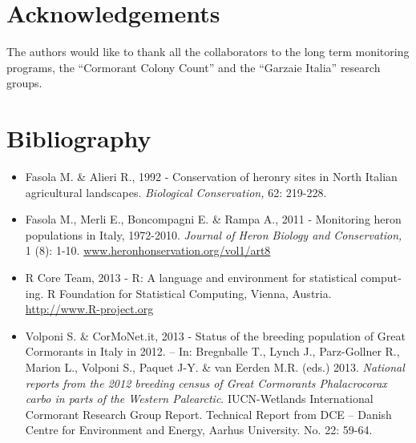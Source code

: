 \begin{otherlanguage}{english}
\section*{Acknowledgements}
The authors would like to thank all the collaborators to the long term
monitoring programs, the {\textquotedblleft}Cormorant Colony
Count{\textquotedblright} and the {\textquotedblleft}Garzaie
Italia{\textquotedblright} research groups.

\section*{Bibliography}
\begin{itemize}\itemsep0pt

	\item Fasola M. \& Alieri R., 1992 - Conservation of heronry sites in North
Italian agricultural landscapes. \textit{Biological Conservation,} 62:
219-228.

	\item Fasola M., Merli E., Boncompagni E. \& Rampa A., 2011 - Monitoring heron
populations in Italy, 1972-2010. \textit{Journal of Heron Biology and
Conservation,} 1 (8): 1-10. \url{www.heronhonservation.org/vol1/art8}

	\item R Core Team, 2013 - R: A language and environment for statistical
computing. R Foundation for Statistical Computing, Vienna, Austria. \\ \url{http://www.R-project.org}

	\item Volponi S. \& CorMoNet.it, 2013 - Status of the breeding population of
Great Cormorants in Italy in 2012. -- In: Bregnballe T., Lynch J.,
Parz-Gollner R., Marion L., Volponi S., Paquet J-Y. \& van Eerden M.R.
(eds.) 2013. \textit{National reports from the 2012 breeding census of
Great Cormorants Phalacrocorax carbo in parts of the Western
Palearctic}. IUCN-Wetlands International Cormorant Research Group
Report. Technical Report from DCE -- Danish Centre for Environment and
Energy, Aarhus University. No. 22: 59-64.
\end{itemize}
\end{otherlanguage}